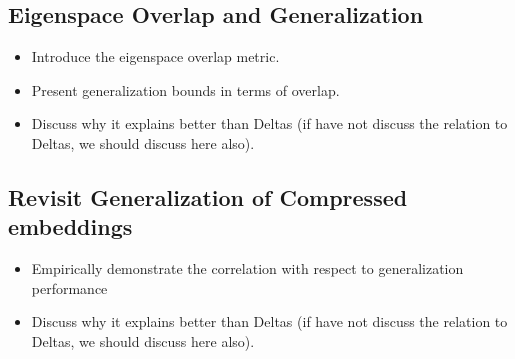 %	

\subsection{Eigenspace Overlap and Generalization}
\label{subsec:eigen_overlap}
    \begin{itemize}
        \item Introduce the eigenspace overlap metric.
		\item Present generalization bounds in terms of overlap.
        \item Discuss why it explains better than Deltas (if have not discuss the relation to Deltas, we should discuss here also).
    \end{itemize}

\subsection{Revisit Generalization of Compressed embeddings}
\label{subsec:revisit}
\begin{itemize}
    \item Empirically demonstrate the correlation with respect to generalization performance
    \item Discuss why it explains better than Deltas (if have not discuss the relation to Deltas, we should discuss here also).
\end{itemize}